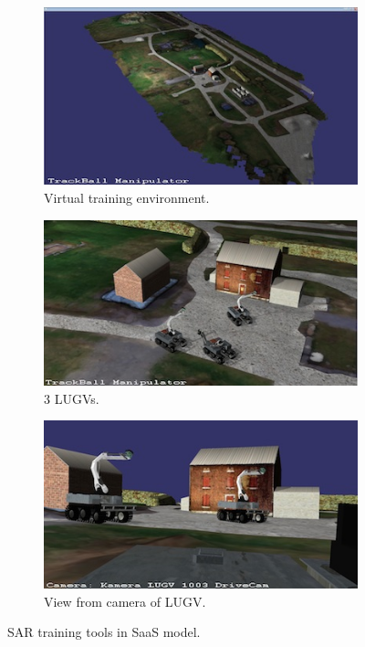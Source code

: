 \documentclass{article}
\begin{document}
\begin{figure} [h]
    \centering
    \begin{subfigure} [b]{0.33\textwidth}
         \centering
         \includegraphics[scale=0.5]{ROB-15-0035_fig37a.png}
         \caption{Virtual training environment.}
         \label{fig:map}
    \end{subfigure}
    \begin{subfigure} [b]{0.33\textwidth}
         \centering
         \includegraphics[scale=0.52]{ROB-15-0035_fig37b.png}
         \caption{3 LUGVs.}
         \label{fig:LUGV3}
    \end{subfigure}
    \begin{subfigure} [b]{0.33\textwidth}
         \centering
         \includegraphics[scale=0.5]{ROB-15-0035_fig37c.png}
         \caption{View from camera of LUGV.}
         \label{fig:LUGV2}
    \end{subfigure}
    \caption{SAR training tools in SaaS model.}
    \label{fig:training}
\end{figure}
\end{document}
